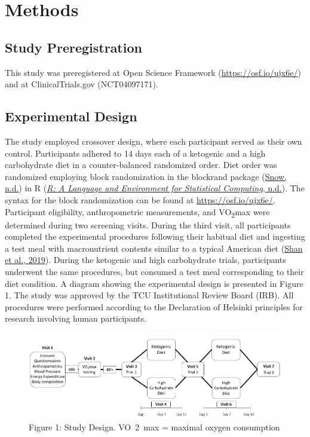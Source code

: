\documentclass[]{cik}%
\begin{document}
\hypertarget{methods}{%
\section{Methods}\label{methods}}

\hypertarget{study-preregistration}{%
\subsection{Study Preregistration}\label{study-preregistration}}

This study was preregistered at Open Science Framework
(\url{https://osf.io/ujx6e/}) and at ClinicalTrials.gov (NCT04097171).

\hypertarget{experimental-design}{%
\subsection{Experimental Design}\label{experimental-design}}

The study employed crossover design, where each participant served as
their own control. Participants adhered to 14 days each of a ketogenic
and a high carbohydrate diet in a counter-balanced randomized order.
Diet order was randomized employing block randomization in the blockrand
package (\protect\hyperlink{ref-30}{Snow, n.d.}) in R
(\protect\hyperlink{ref-31}{\emph{R: A Language and Environment for
Statistical Computing}, n.d.}). The syntax for the block randomization
can be found at \url{https://osf.io/ujx6e/}. Participant eligibility,
anthropometric measurements, and VO\textsubscript{2}max were determined
during two screening visits. During the third visit, all participants
completed the experimental procedures following their habitual diet and
ingesting a test meal with macronutrient contents similar to a typical
American diet (\protect\hyperlink{ref-32}{Shan et al., 2019}). During
the ketogenic and high carbohydrate trials, participants underwent the
same procedures, but consumed a test meal corresponding to their diet
condition. A diagram showing the experimental design is presented in
Figure 1. The study was approved by the TCU Institutional Review Board
(IRB). All procedures were performed according to the Declaration of
Helsinki principles for research involving human participants.

\begin{figure}[H]
\includegraphics[width=1\linewidth]{figures/figure1} \caption{Figure 1: Study Design. VO~2~max = maximal oxygen consumption}\label{fig:fig1pdf}
\end{figure}
\end{document}
